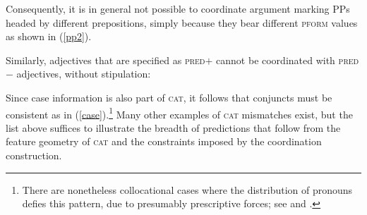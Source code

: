 \documentclass[output=paper]{langsci/langscibook}
\begin{document}
\begin{exe}
\ex
\begin{xlista}
\end{xlista}\label{pp}
\end{exe}

\noindent
Consequently, it is in general not possible to coordinate argument marking PPs headed by different prepositions, simply because they bear
different \textsc{pform} values as shown in (\ref{pp2}).

\begin{exe}
\ex
\begin{xlista}

\end{xlista}\label{pp2}
\end{exe}

Similarly, adjectives that are specified as \textsc{pred}$+$ cannot be
coordinated with  \textsc{pred}$-$ adjectives, without stipulation:

\begin{exe}
\ex
\begin{xlista}
 \end{xlista}
\end{exe}


\noindent
Since case information is also part of \textsc{cat}, it follows that conjuncts must be consistent as in (\ref{case}).\footnote{There are nonetheless collocational cases where the distribution of pronouns defies this pattern, due to presumably prescriptive forces; see \citet{grano} and \citet{binomial}.} Many other examples of \textsc{cat} mismatches exist, but the  list above suffices to
illustrate the breadth of predictions that follow from the feature geometry of \textsc{cat} and the constraints imposed by
the coordination construction.
\end{document}
